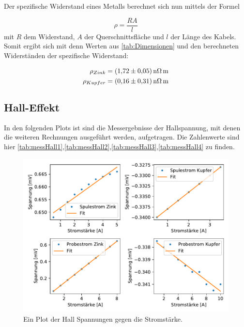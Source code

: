     Der spezifische Widerstand eines Metalls berechnet sich nun mittels der Formel

    \begin{equation}
        \rho = \frac{RA}{l}
    \end{equation}
    \noindent
    mit $R$ dem Widerstand, $A$ der Querschnittsfläche und $l$ der Länge des Kabels.
    Somit ergibt sich mit denn Werten aus \ref{tab:Dimensionen} und den berechneten Widerständen der spezifische Widerstand:

    \begin{align}
        \rho_{Zink} &= \SI{1.72+-0.05}{\nano\ohm\meter}\\
        \rho_{Kupfer} &= \SI{0.16+-0.31}{\nano\ohm\meter}
    \end{align}


    \subsection{Hall-Effekt}

    

    In den folgenden Plots ist sind die Messergebnisse der Hallspannung, mit denen die weiteren Rechnungen ausgeführt werden, 
    aufgetragen. Die Zahlenwerte sind hier \ref{tab:messHall1},\ref{tab:messHall2},\ref{tab:messHall3},\ref{tab:messHall4} zu finden.
    

    \begin{figure}[H]
        \centering
        \includegraphics[width=1.1\textwidth]{build/Hall.pdf}
        \caption{Ein Plot der Hall Spannungen gegen die Stromstärke.}
        \label{img:messHall}
    \end{figure}
    
